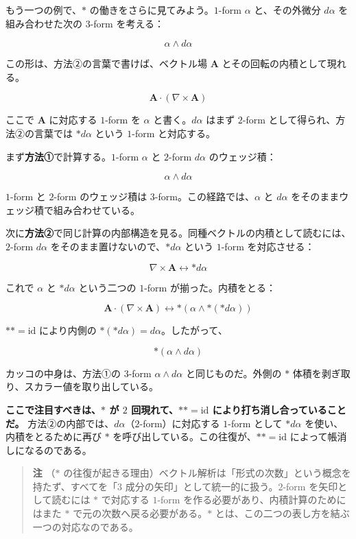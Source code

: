 \documentclass[a4paper,12pt,openany]{book}
\begin{document}
もう一つの例で、\(\ast\) の働きをさらに見てみよう。\(1\)-form \(\alpha\)
と、その外微分 \(d\alpha\) を組み合わせた次の \(3\)-form を考える：

\[\alpha \wedge d\alpha\]

この形は、方法②の言葉で書けば、ベクトル場 \(\mathbf{A}\)
とその回転の内積として現れる。

\[\mathbf{A} \cdot (\nabla \times \mathbf{A})\]

ここで \(\mathbf{A}\) に対応する \(1\)-form を \(\alpha\)
と書く。\(d\alpha\) はまず \(2\)-form として得られ、方法②の言葉では
\(\ast d\alpha\) という \(1\)-form と対応する。

まず\textbf{方法①}で計算する。\(1\)-form \(\alpha\) と \(2\)-form
\(d\alpha\) のウェッジ積：

\[\alpha \wedge d\alpha\]

\(1\)-form と \(2\)-form のウェッジ積は
\(3\)-form。この経路では、\(\alpha\) と \(d\alpha\)
をそのままウェッジ積で組み合わせている。

次に\textbf{方法②}で同じ計算の内部構造を見る。同種ベクトルの内積として読むには、\(2\)-form
\(d\alpha\) をそのまま置けないので、\(\ast d\alpha\) という \(1\)-form
を対応させる：

\[\nabla \times \mathbf{A} \longleftrightarrow \ast d\alpha\]

これで \(\alpha\) と \(\ast d\alpha\) という二つの \(1\)-form
が揃った。内積をとる：

\[\mathbf{A} \cdot (\nabla \times \mathbf{A}) \longleftrightarrow \ast(\alpha \wedge \ast(\ast d\alpha))\]

\(\ast\ast = \mathrm{id}\) により内側の
\(\ast(\ast d\alpha) = d\alpha\)。したがって、

\[\ast(\alpha \wedge d\alpha)\]

カッコの中身は、方法①の \(3\)-form \(\alpha \wedge d\alpha\)
と同じものだ。外側の \(\ast\)
体積を剥ぎ取り、スカラー値を取り出している。

\textbf{ここで注目すべきは、$\ast$ が $2$ 回現れて、$\ast\ast = \mathrm{id}$ により打ち消し合っていることだ。}
方法②の内部では、\(d\alpha\)（\(2\)-form）に対応する \(1\)-form として
\(\ast d\alpha\) を使い、内積をとるために再び \(\ast\)
を呼び出している。この往復が、\(\ast\ast = \mathrm{id}\)
によって帳消しになるのである。

\begin{quote}
\textbf{注} （\(\ast\)
の往復が起きる理由）ベクトル解析は「形式の次数」という概念を持たず、すべてを「\(3\)
成分の矢印」として統一的に扱う。\(2\)-form を矢印として読むには \(\ast\)
で対応する \(1\)-form を作る必要があり、内積計算のためにはまた \(\ast\)
で元の次数へ戻る必要がある。\(\ast\)
とは、この二つの表し方を結ぶ一つの対応なのである。
\end{quote}
\end{document}

